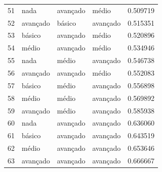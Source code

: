 \documentclass[]{article}
\begin{document}
\begin{longtable}{|llll|r|}
		51 & nada      & avançado & médio    & 0.509719     \\
		52 & avançado & básico   & avançado & 0.515351     \\
		53 & básico   & avançado & médio    & 0.520896     \\
		54 & médio    & avançado & médio    & 0.534946     \\
		55 & nada      & médio    & avançado & 0.546738     \\
		56 & avançado & avançado & médio    & 0.552083     \\
		57 & básico   & médio    & avançado & 0.556898     \\
		58 & médio    & médio    & avançado & 0.569892     \\
		59 & avançado & médio    & avançado & 0.585938     \\
		60 & nada      & avançado & avançado & 0.636060     \\
		61 & básico   & avançado & avançado & 0.643519     \\
		62 & médio    & avançado & avançado & 0.653646     \\
		63 & avançado & avançado & avançado & 0.666667     \\
		\hline
	\end{longtable}
	
\end{document}

